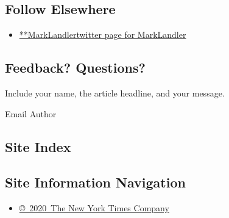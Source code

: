 \hypertarget{follow-elsewhere}{%
\subsection{Follow Elsewhere}\label{follow-elsewhere}}

\begin{itemize}
\tightlist
\item
  \href{https://twitter.com/MarkLandler}{**MarkLandlertwitter page for
  MarkLandler}
\end{itemize}

\hypertarget{feedback-questions}{%
\subsection{Feedback? Questions?}\label{feedback-questions}}

Include your name, the article headline, and your message.

Email Author

\hypertarget{site-index}{%
\subsection{Site Index}\label{site-index}}

\hypertarget{site-information-navigation}{%
\subsection{Site Information
Navigation}\label{site-information-navigation}}

\begin{itemize}
\tightlist
\item
  \href{https://help.nytimes.com/hc/en-us/articles/115014792127-Copyright-notice}{©~2020~The
  New York Times Company}
\end{itemize}

